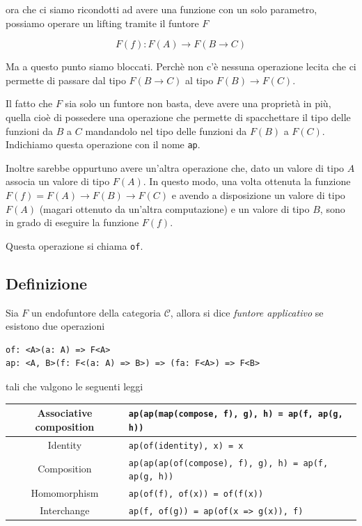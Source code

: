 \documentclass[12pt]{article}
\begin{document}
ora che ci siamo ricondotti ad avere una funzione con un solo parametro, possiamo operare un lifting tramite il funtore $F$

$$
F(f): F(A) \rightarrow F(B \rightarrow C)
$$

Ma a questo punto siamo bloccati.
Perchè non c'è nessuna operazione lecita che ci permette di passare dal tipo $F(B \rightarrow C)$ al tipo $F(B) \rightarrow F(C)$.

Il fatto che $F$ sia solo un funtore non basta, deve avere una proprietà in più, quella cioè di possedere una operazione che permette di
spacchettare il tipo delle funzioni da $B$ a $C$ mandandolo nel tipo delle funzioni da $F(B)$ a $F(C)$.
Indichiamo questa operazione con il nome \texttt{ap}.

Inoltre sarebbe oppurtuno avere un'altra operazione che, dato un valore di tipo $A$ associa un valore di tipo $F(A)$.
In questo modo, una volta ottenuta la funzione $F(f) = F(A) \rightarrow F(B) \rightarrow F(C)$ e avendo a disposizione un valore di tipo $F(A)$
(magari ottenuto da un'altra computazione) e un valore di tipo $B$, sono in grado di eseguire la funzione $F(f)$.

Questa operazione si chiama \texttt{of}.

\subsection{Definizione}

Sia $F$ un endofuntore della categoria $\mathcal{C}$, allora si dice \emph{funtore applicativo} se esistono due operazioni

\begin{verbatim}
of: <A>(a: A) => F<A>
ap: <A, B>(f: F<(a: A) => B>) => (fa: F<A>) => F<B>
\end{verbatim}

tali che valgono le seguenti leggi

\begin{center}
\bgroup
\def\arraystretch{1.5}
\begin{tabular}{ |c|p{10cm}| }
\hline
Associative composition & \texttt{ap(ap(map(compose, f), g), h) = ap(f, ap(g, h))} \\
\hline
Identity & \texttt{ap(of(identity), x) = x} \\
\hline
Composition & \texttt{ap(ap(ap(of(compose), f), g), h) = ap(f, ap(g, h))} \\
\hline
Homomorphism & \texttt{ap(of(f), of(x)) = of(f(x))} \\
\hline
Interchange & \texttt{ap(f, of(g)) = ap(of(x => g(x)), f)} \\
\hline
\end{tabular}
\egroup
\end{center}
\end{document}
